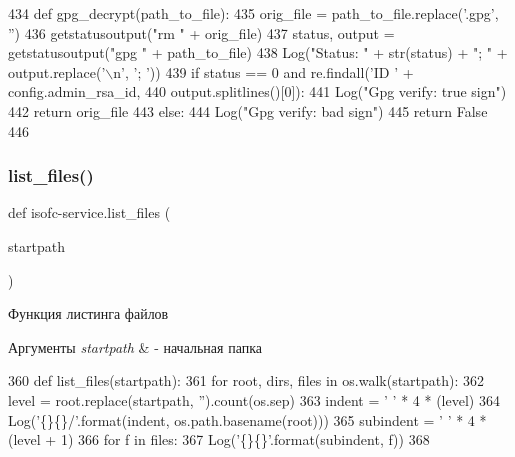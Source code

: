 \begin{DoxyCode}
434 \textcolor{keyword}{def }gpg\_decrypt(path\_to\_file):
435     orig\_file = path\_to\_file.replace(\textcolor{stringliteral}{'.gpg'}, \textcolor{stringliteral}{''})
436     getstatusoutput(\textcolor{stringliteral}{"rm "} + orig\_file)
437     status, output = getstatusoutput(\textcolor{stringliteral}{"gpg "} + path\_to\_file)
438     Log(\textcolor{stringliteral}{"Status: "} + str(status) + \textcolor{stringliteral}{"; "} + output.replace(\textcolor{stringliteral}{'\(\backslash\)n'}, \textcolor{stringliteral}{'; '}))
439     \textcolor{keywordflow}{if} status == 0 \textcolor{keywordflow}{and} re.findall(\textcolor{stringliteral}{'ID '} + config.admin\_rsa\_id,
440                                   output.splitlines()[0]):
441         Log(\textcolor{stringliteral}{"Gpg verify: true sign"})
442         \textcolor{keywordflow}{return} orig\_file
443     \textcolor{keywordflow}{else}:
444         Log(\textcolor{stringliteral}{"Gpg verify: bad sign"})
445         \textcolor{keywordflow}{return} \textcolor{keyword}{False}
446 
\end{DoxyCode}
\mbox{\label{isofc-service_8py_file_ad73dd86c759cc2bab83e283b1ec6f40e}} 
\subsubsection{\texorpdfstring{list\+\_\+files()}{list\_files()}}
{\footnotesize\ttfamily def isofc-\/service.\+list\+\_\+files (\begin{DoxyParamCaption}\item[{}]{startpath }\end{DoxyParamCaption})}



Функция листинга файлов 


\begin{DoxyParams}{Аргументы}
{\em startpath} & -\/ начальная папка \\
\hline
\end{DoxyParams}

\begin{DoxyCode}
360 \textcolor{keyword}{def }list\_files(startpath):
361     \textcolor{keywordflow}{for} root, dirs, files \textcolor{keywordflow}{in} os.walk(startpath):
362         level = root.replace(startpath, \textcolor{stringliteral}{''}).count(os.sep)
363         indent = \textcolor{stringliteral}{' '} * 4 * (level)
364         Log(\textcolor{stringliteral}{'\{\}\{\}/'}.format(indent, os.path.basename(root)))
365         subindent = \textcolor{stringliteral}{' '} * 4 * (level + 1)
366         \textcolor{keywordflow}{for} f \textcolor{keywordflow}{in} files:
367             Log(\textcolor{stringliteral}{'\{\}\{\}'}.format(subindent, f))
368 
\end{DoxyCode}
\mbox{\label{isofc-service_8py_file_a5cea1ede56356bb641ac929c378c1dd8}} 
